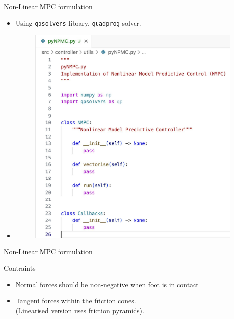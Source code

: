 \documentclass{beamer}
\begin{document}
\begin{frame}{Non-Linear MPC formulation}
\begin{itemize}
    \item Using \texttt{qpsolvers} library, \texttt{quadprog} solver.
    \item 
\begin{figure}
    \centering
    \includegraphics[width=0.75\linewidth]{Presentation-2/WhatsApp Image 2024-09-30 at 17.18.57_d0017338.jpg}
  
\end{figure}
\end{itemize}
\end{frame}


\begin{frame}{Non-Linear MPC formulation}
\begin{block}{Contraints}
\begin{itemize}
    \item Normal forces should be non-negative when foot is in contact
    \item Tangent forces within the friction cones.\\
        (Linearised version uses friction pyramids).
\end{itemize}
\end{block}
\end{frame}
\end{document}
